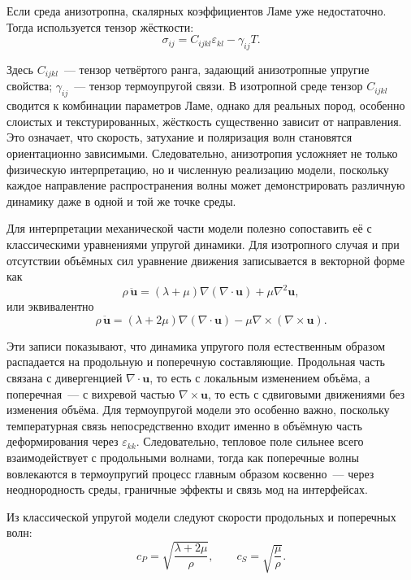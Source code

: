 Если среда анизотропна, скалярных коэффициентов Ламе уже недостаточно. Тогда используется тензор жёсткости:
\begin{equation}
\sigma_{ij}=C_{ijkl}\varepsilon_{kl}-\gamma_{ij}T.
\end{equation}

Здесь $C_{ijkl}$~--- тензор четвёртого ранга, задающий анизотропные упругие свойства; $\gamma_{ij}$~--- тензор термоупругой связи. В изотропной среде тензор $C_{ijkl}$ сводится к комбинации параметров Ламе, однако для реальных пород, особенно слоистых и текстурированных, жёсткость существенно зависит от направления. Это означает, что скорость, затухание и поляризация волн становятся ориентационно зависимыми. Следовательно, анизотропия усложняет не только физическую интерпретацию, но и численную реализацию модели, поскольку каждое направление распространения волны может демонстрировать различную динамику даже в одной и той же точке среды.

Для интерпретации механической части модели полезно сопоставить её с классическими уравнениями упругой динамики. Для изотропного случая и при отсутствии объёмных сил уравнение движения записывается в векторной форме как
\begin{equation}
\rho\,\ddot{\mathbf{u}}=(\lambda+\mu)\nabla(\nabla\!\cdot\mathbf{u})+\mu\nabla^2\mathbf{u},
\end{equation}
или эквивалентно
\begin{equation}
\rho\,\ddot{\mathbf{u}}=(\lambda+2\mu)\nabla(\nabla\!\cdot\mathbf{u})-\mu\nabla\times(\nabla\times\mathbf{u}).
\end{equation}

Эти записи показывают, что динамика упругого поля естественным образом распадается на продольную и поперечную составляющие. Продольная часть связана с дивергенцией $\nabla\!\cdot\mathbf{u}$, то есть с локальным изменением объёма, а поперечная~--- с вихревой частью $\nabla\times\mathbf{u}$, то есть с сдвиговыми движениями без изменения объёма. Для термоупругой модели это особенно важно, поскольку температурная связь непосредственно входит именно в объёмную часть деформирования через $\varepsilon_{kk}$. Следовательно, тепловое поле сильнее всего взаимодействует с продольными волнами, тогда как поперечные волны вовлекаются в термоупругий процесс главным образом косвенно~--- через неоднородность среды, граничные эффекты и связь мод на интерфейсах.

Из классической упругой модели следуют скорости продольных и поперечных волн:
\begin{equation}
c_P=\sqrt{\frac{\lambda+2\mu}{\rho}},\qquad
c_S=\sqrt{\frac{\mu}{\rho}}.
\end{equation}

